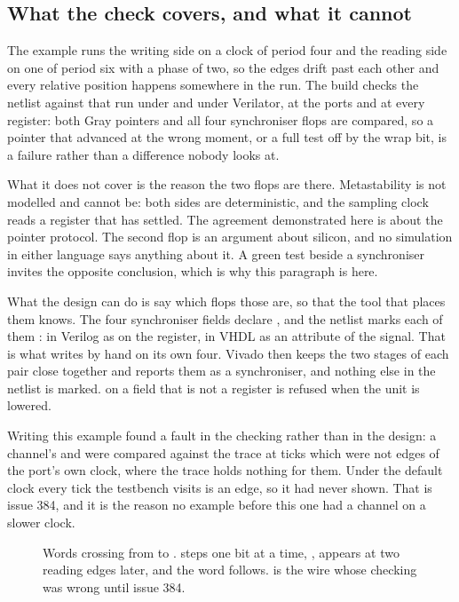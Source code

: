 \subsection{What the check covers, and what it cannot}

The example runs the writing side on a clock of period four and the
reading side on one of period six with a phase of two, so the edges
drift past each other and every relative position happens somewhere
in the run. The build checks the netlist against that run under
 and under Verilator, at the ports and at every register:
both Gray pointers and all four synchroniser flops are compared, so a
pointer that advanced at the wrong moment, or a full test off by the
wrap bit, is a failure rather than a difference nobody looks at.

What it does not cover is the reason the two flops are there.
Metastability is not modelled and cannot be: both sides are
deterministic, and the sampling clock reads a register that has
settled. The agreement demonstrated here is about the pointer
protocol. The second flop is an argument about silicon, and no
simulation in either language says anything about it. A green test
beside a synchroniser invites the opposite conclusion, which is why
this paragraph is here.

What the design can do is say which flops those are, so that the
tool that places them knows. The four synchroniser fields declare
, and the netlist marks each of them
: in Verilog as  on
the register, in VHDL as an attribute of the signal. That is what
 writes by hand on its own four. Vivado
then keeps the two stages of each pair close together and reports
them as a synchroniser, and nothing else in the netlist is marked.
 on a field that is not a register is refused
when the unit is lowered.

Writing this example found a fault in the checking rather than in the
design: a channel's  and  were compared
against the trace at ticks which were not edges of the port's own
clock, where the trace holds nothing for them. Under the default
clock every tick the testbench visits is an edge, so it had never
shown. That is issue 384, and it is the reason no example before this
one had a channel on a slower clock.

\begin{figure}[htbp]
\centering

\caption{Words crossing from  to .
 steps one bit at a time, ,
appears at  two reading edges later, and the word
follows.  is the wire whose checking was wrong
until issue 384.}
\label{fig:x-cdc}
\end{figure}

